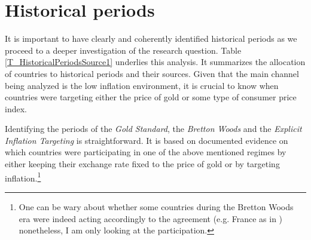 \documentclass[12pt]{article}
\newcommand{\annote}[1]{\parbox{\textwidth}{\renewcommand{\baselinestretch}{1.0}\vspace{12pt} \footnotesize Notes: #1}}
\begin{document}
\begin{appendices}
\begin{figure}[h!]
\end{figure}



\clearpage

\setcounter{table}{0}
\setcounter{figure}{0}

\section{Historical periods} \label{SS_HistoricalPeriods}

It is important to have clearly and coherently identified historical periods as we proceed to a deeper investigation of the research question. Table \ref{T_HistoricalPeriodsSource1} underlies this analysis. It summarizes the allocation of countries to historical periods and their sources. Given that the main channel being analyzed is the low inflation environment, it is crucial to know when countries were targeting either the price of gold or some type of consumer price index.

Identifying the periods of the \textit{Gold Standard}, the \textit{Bretton Woods} and the \textit{Explicit Inflation Targeting} is straightforward. It is based on documented evidence on which countries were participating in one of the above mentioned regimes by either keeping their exchange rate fixed to the price of gold or by targeting inflation.\footnote{One can be wary about whether some countries during the Bretton Woods era were indeed acting accordingly to the agreement (e.g. France as in \cite{Bordo1995}) nonetheless, I am only looking at the participation.}


\end{appendices}
\end{document}
